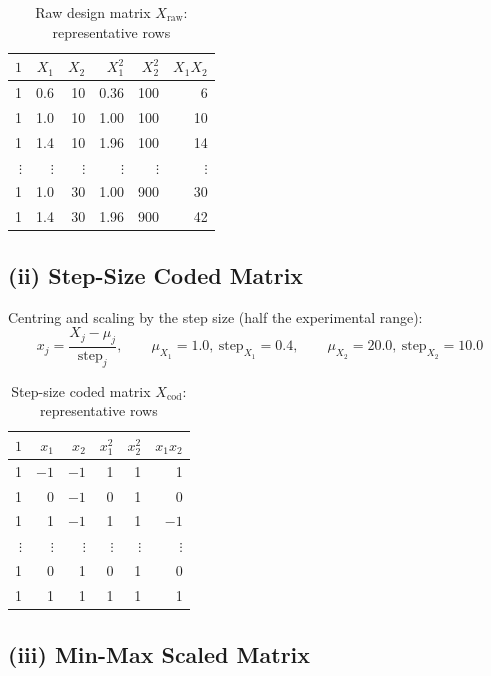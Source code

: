 \documentclass[12pt,a4paper]{article}
\begin{document}
\begin{table}[H]
\centering
\caption{Raw design matrix $X_{\text{raw}}$: representative rows}
\begin{tabular}{rrrrrr}
\toprule
$1$ & $X_1$ & $X_2$ & $X_1^2$ & $X_2^2$ & $X_1 X_2$ \\
\midrule
1 & 0.6 & 10 & 0.36 & 100 &  6 \\
1 & 1.0 & 10 & 1.00 & 100 & 10 \\
1 & 1.4 & 10 & 1.96 & 100 & 14 \\
$\vdots$ & $\vdots$ & $\vdots$ & $\vdots$ & $\vdots$ & $\vdots$ \\
1 & 1.0 & 30 & 1.00 & 900 & 30 \\
1 & 1.4 & 30 & 1.96 & 900 & 42 \\
\bottomrule
\end{tabular}
\end{table}

\subsection{(ii) Step-Size Coded Matrix}

Centring and scaling by the step size (half the experimental range):
\[
  x_j = \frac{X_j - \mu_j}{\text{step}_j}, \qquad
  \mu_{X_1} = 1.0,\ \text{step}_{X_1} = 0.4, \qquad
  \mu_{X_2} = 20.0,\ \text{step}_{X_2} = 10.0
\]

\begin{table}[H]
\centering
\caption{Step-size coded matrix $X_{\text{cod}}$: representative rows}
\begin{tabular}{rrrrrr}
\toprule
$1$ & $x_1$ & $x_2$ & $x_1^2$ & $x_2^2$ & $x_1 x_2$ \\
\midrule
1 & $-1$ & $-1$ &  1 & 1 &  1 \\
1 &  0   & $-1$ &  0 & 1 &  0 \\
1 &  1   & $-1$ &  1 & 1 & $-1$ \\
$\vdots$ & $\vdots$ & $\vdots$ & $\vdots$ & $\vdots$ & $\vdots$ \\
1 &  0   &  1   &  0 & 1 &  0 \\
1 &  1   &  1   &  1 & 1 &  1 \\
\bottomrule
\end{tabular}
\end{table}

\subsection{(iii) Min-Max Scaled Matrix}
\end{document}
